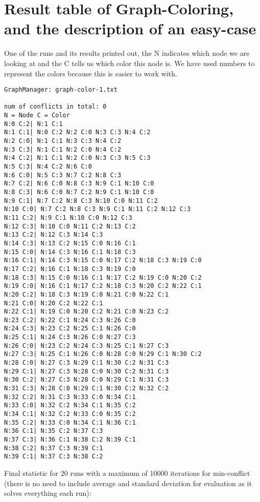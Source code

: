 \documentclass[12pt, a4paper]{article}
\begin{document}
\section{Result table of Graph-Coloring, and the description of an easy-case}
One of the runs and its results printed out, the N indicates which node we are looking at and the C tells us which color this node is. We have used numbers to represent the colors because this is easier to work with.\\
\begin{verbatim}
GraphManager: graph-color-1.txt

num of conflicts in total: 0
N = Node C = Color
N:0 C:2| N:1 C:1 
N:1 C:1| N:0 C:2 N:2 C:0 N:3 C:3 N:4 C:2 
N:2 C:0| N:1 C:1 N:3 C:3 N:4 C:2 
N:3 C:3| N:1 C:1 N:2 C:0 N:4 C:2 
N:4 C:2| N:1 C:1 N:2 C:0 N:3 C:3 N:5 C:3 
N:5 C:3| N:4 C:2 N:6 C:0 
N:6 C:0| N:5 C:3 N:7 C:2 N:8 C:3 
N:7 C:2| N:6 C:0 N:8 C:3 N:9 C:1 N:10 C:0 
N:8 C:3| N:6 C:0 N:7 C:2 N:9 C:1 N:10 C:0 
N:9 C:1| N:7 C:2 N:8 C:3 N:10 C:0 N:11 C:2 
N:10 C:0| N:7 C:2 N:8 C:3 N:9 C:1 N:11 C:2 N:12 C:3 
N:11 C:2| N:9 C:1 N:10 C:0 N:12 C:3 
N:12 C:3| N:10 C:0 N:11 C:2 N:13 C:2 
N:13 C:2| N:12 C:3 N:14 C:3 
N:14 C:3| N:13 C:2 N:15 C:0 N:16 C:1 
N:15 C:0| N:14 C:3 N:16 C:1 N:18 C:3 
N:16 C:1| N:14 C:3 N:15 C:0 N:17 C:2 N:18 C:3 N:19 C:0 
N:17 C:2| N:16 C:1 N:18 C:3 N:19 C:0 
N:18 C:3| N:15 C:0 N:16 C:1 N:17 C:2 N:19 C:0 N:20 C:2 
N:19 C:0| N:16 C:1 N:17 C:2 N:18 C:3 N:20 C:2 N:22 C:1 
N:20 C:2| N:18 C:3 N:19 C:0 N:21 C:0 N:22 C:1 
N:21 C:0| N:20 C:2 N:22 C:1 
N:22 C:1| N:19 C:0 N:20 C:2 N:21 C:0 N:23 C:2 
N:23 C:2| N:22 C:1 N:24 C:3 N:26 C:0 
N:24 C:3| N:23 C:2 N:25 C:1 N:26 C:0 
N:25 C:1| N:24 C:3 N:26 C:0 N:27 C:3 
N:26 C:0| N:23 C:2 N:24 C:3 N:25 C:1 N:27 C:3 
N:27 C:3| N:25 C:1 N:26 C:0 N:28 C:0 N:29 C:1 N:30 C:2 
N:28 C:0| N:27 C:3 N:29 C:1 N:30 C:2 N:31 C:3 
N:29 C:1| N:27 C:3 N:28 C:0 N:30 C:2 N:31 C:3 
N:30 C:2| N:27 C:3 N:28 C:0 N:29 C:1 N:31 C:3 
N:31 C:3| N:28 C:0 N:29 C:1 N:30 C:2 N:32 C:2 
N:32 C:2| N:31 C:3 N:33 C:0 N:34 C:1 
N:33 C:0| N:32 C:2 N:34 C:1 N:35 C:2 
N:34 C:1| N:32 C:2 N:33 C:0 N:35 C:2 
N:35 C:2| N:33 C:0 N:34 C:1 N:36 C:1 
N:36 C:1| N:35 C:2 N:37 C:3 
N:37 C:3| N:36 C:1 N:38 C:2 N:39 C:1 
N:38 C:2| N:37 C:3 N:39 C:1 
N:39 C:1| N:37 C:3 N:38 C:2 

\end{verbatim}
\noindent
Final statistic for 20 runs with a maximum of 10000 iterations for min-conflict (there is no need to include average and standard deviation for evaluation as it solves everything each run):\\
\end{document}
